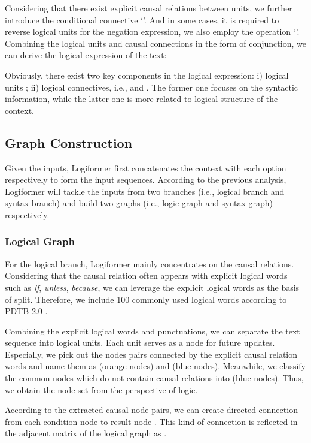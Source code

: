 \documentclass[sigconf]{acmart}
\begin{document}
Considering that there exist explicit causal relations between units, we 
further introduce the conditional connective `'. And in some cases, it is 
required to reverse logical units for the negation expression, we also employ 
the operation `'. Combining the logical units and causal connections in 
the form of conjunction, we can derive the logical expression of the text:

\vspace{-0.1cm}


Obviously, there exist two key components in the logical expression: i) logical units ; ii) logical connectives, i.e.,  and . The former one focuses on the syntactic information, while the latter one is more related to logical structure of the context. 


\subsection{Graph Construction}
Given the  inputs, Logiformer first concatenates the context  with each option  respectively to form the input sequences. According to the previous analysis, Logiformer will tackle the inputs from two branches (i.e., logical branch and syntax branch) and build two graphs (i.e., logic graph and syntax graph) respectively.

\subsubsection{\textbf{Logical Graph}}
For the logical branch, Logiformer mainly concentrates on the causal relations. 
Considering that the causal relation often appears with explicit logical words 
such as \textit{if}, \textit{unless}, \textit{because}, we can leverage the 
explicit logical words as the basis of split. Therefore, we include 100 
commonly used logical words according to PDTB 2.0 \cite{prasad2008penn}.

Combining the explicit logical words and punctuations, we can separate the text 
sequence into logical units. Each unit serves as a node for future updates. 
Especially, we pick out the nodes pairs connected by the explicit causal 
relation words and name them as   (orange nodes) and  
 (blue nodes). Meanwhile, we classify the common nodes which do not 
contain causal relations into   (blue nodes). Thus, we obtain the 
node set from the perspective of logic.

According to the extracted causal node pairs, we can create directed connection 
from each condition node  to result node . This kind of connection is 
reflected in the adjacent matrix  of the logical graph as 
.
\end{document}
